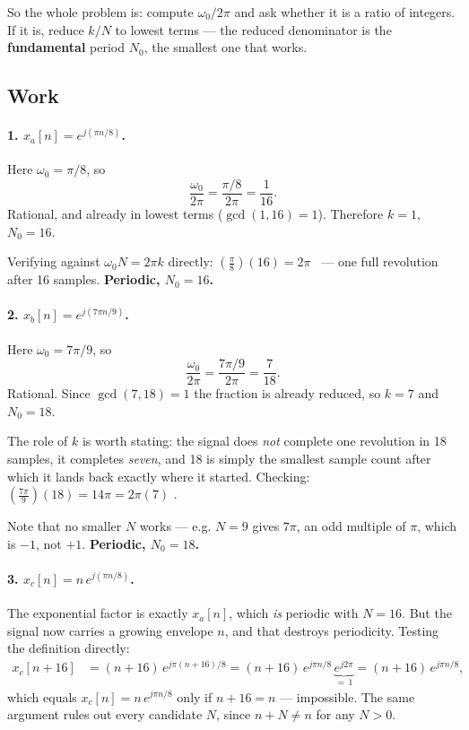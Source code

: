 So the whole problem is: compute $\omega_0/2\pi$ and ask whether it is a ratio of
integers. If it is, reduce $k/N$ to lowest terms — the reduced denominator is the
\textbf{fundamental} period $N_0$, the smallest one that works.

\subsection*{Work}

\paragraph{1. $x_a[n] = e^{j(\pi n/8)}$.}
Here $\omega_0 = \pi/8$, so
\begin{equation}
  \frac{\omega_0}{2\pi} = \frac{\pi/8}{2\pi} = \frac{1}{16}.
\end{equation}
Rational, and already in lowest terms ($\gcd(1,16) = 1$). Therefore $k = 1$,
$N_0 = 16$.

Verifying against $\omega_0 N = 2\pi k$ directly:
$\left(\frac{\pi}{8}\right)(16) = 2\pi$ \checkmark\ — one full revolution after
16 samples. \textbf{Periodic, $N_0 = 16$.}

\paragraph{2. $x_b[n] = e^{j(7\pi n/9)}$.}
Here $\omega_0 = 7\pi/9$, so
\begin{equation}
  \frac{\omega_0}{2\pi} = \frac{7\pi/9}{2\pi} = \frac{7}{18}.
\end{equation}
Rational. Since $\gcd(7,18) = 1$ the fraction is already reduced, so $k = 7$ and
$N_0 = 18$.

The role of $k$ is worth stating: the signal does \emph{not} complete one
revolution in 18 samples, it completes \emph{seven}, and 18 is simply the
smallest sample count after which it lands back exactly where it started.
Checking: $\left(\frac{7\pi}{9}\right)(18) = 14\pi = 2\pi(7)$ \checkmark.

Note that no smaller $N$ works — e.g. $N = 9$ gives $7\pi$, an odd multiple of
$\pi$, which is $-1$, not $+1$. \textbf{Periodic, $N_0 = 18$.}

\paragraph{3. $x_c[n] = n\,e^{j(\pi n/8)}$.}
The exponential factor is exactly $x_a[n]$, which \emph{is} periodic with
$N = 16$. But the signal now carries a growing envelope $n$, and that destroys
periodicity. Testing the definition directly:
\begin{align}
  x_c[n+16] &= (n+16)\,e^{j\pi(n+16)/8}
             = (n+16)\,e^{j\pi n/8}\,\underbrace{e^{j2\pi}}_{=\,1}
             = (n+16)\,e^{j\pi n/8},
\end{align}
which equals $x_c[n] = n\,e^{j\pi n/8}$ only if $n + 16 = n$ — impossible. The
same argument rules out every candidate $N$, since $n+N \ne n$ for any $N > 0$.

